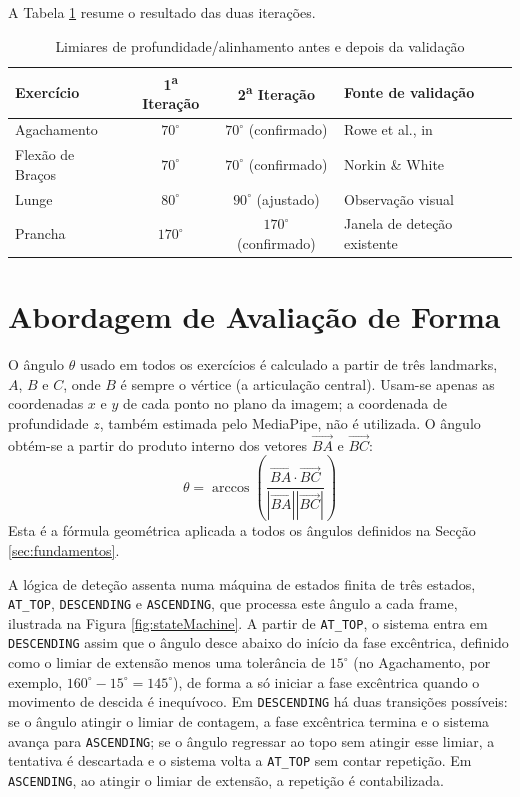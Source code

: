 A Tabela \ref{tab:calibracaoLimiares} resume o resultado das duas iterações.

\begin{table}[H]
   \centering
   \begin{tabular}{lccl}
      \textbf{Exercício} & \textbf{1\textsuperscript{a} Iteração} & \textbf{2\textsuperscript{a} Iteração} & \textbf{Fonte de validação} \\
      \hline
      Agachamento & $70^\circ$ & $70^\circ$ (confirmado) & Rowe et al., in \cite{Norkin_White_2016} \\
      Flexão de Braços & $70^\circ$ & $70^\circ$ (confirmado) & Norkin \& White \cite{Norkin_White_2016} \\
      Lunge & $80^\circ$ & $90^\circ$ (ajustado) & Observação visual \\
      Prancha & $170^\circ$ & $170^\circ$ (confirmado) & Janela de deteção existente \\
      \hline
   \end{tabular}
   \caption{Limiares de profundidade/alinhamento antes e depois da validação}
   \label{tab:calibracaoLimiares}
\end{table}

\section{Abordagem de Avaliação de Forma}
\label{sec:abordagem}

O ângulo $\theta$ usado em todos os exercícios é calculado a partir de três landmarks, $A$, $B$ e $C$, onde $B$ é sempre o vértice (a articulação central). Usam-se apenas as coordenadas $x$ e $y$ de cada ponto no plano da imagem; a coordenada de profundidade $z$, também estimada pelo MediaPipe, não é utilizada. O ângulo obtém-se a partir do produto interno dos vetores $\vec{BA}$ e $\vec{BC}$:
\[
\theta = \arccos\left(\frac{\vec{BA} \cdot \vec{BC}}{|\vec{BA}||\vec{BC}|}\right)
\]
Esta é a fórmula geométrica aplicada a todos os ângulos definidos na Secção \ref{sec:fundamentos}.

A lógica de deteção assenta numa máquina de estados finita de três estados, \texttt{AT\_TOP}, \texttt{DESCENDING} e \texttt{ASCENDING}, que processa este ângulo a cada frame, ilustrada na Figura \ref{fig:stateMachine}. A partir de \texttt{AT\_TOP}, o sistema entra em \texttt{DESCENDING} assim que o ângulo desce abaixo do início da fase excêntrica, definido como o limiar de extensão menos uma tolerância de $15^\circ$ (no Agachamento, por exemplo, $160^\circ - 15^\circ = 145^\circ$), de forma a só iniciar a fase excêntrica quando o movimento de descida é inequívoco. Em \texttt{DESCENDING} há duas transições possíveis: se o ângulo atingir o limiar de contagem, a fase excêntrica termina e o sistema avança para \texttt{ASCENDING}; se o ângulo regressar ao topo sem atingir esse limiar, a tentativa é descartada e o sistema volta a \texttt{AT\_TOP} sem contar repetição. Em \texttt{ASCENDING}, ao atingir o limiar de extensão, a repetição é contabilizada.

